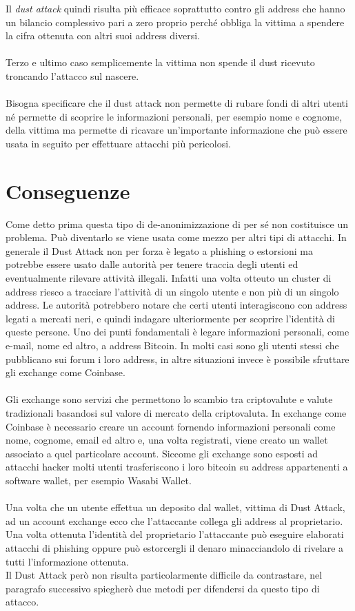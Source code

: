 \FloatBarrier
Il \textit{dust attack} quindi risulta più efficace soprattutto contro gli address che hanno un bilancio complessivo pari a zero proprio perché obbliga la vittima a spendere la cifra ottenuta con altri suoi address diversi.\\\\
Terzo e ultimo caso semplicemente la vittima non spende il dust ricevuto troncando l'attacco sul nascere.\\\\
Bisogna specificare che il dust attack non permette di rubare fondi di altri utenti né permette di scoprire le informazioni personali, per esempio nome e cognome, della vittima ma permette di ricavare un'importante informazione che può essere usata in seguito per effettuare attacchi più pericolosi.
\section{Conseguenze}
Come detto prima questa tipo di de-anonimizzazione di per sé non costituisce un problema. Può diventarlo se viene usata come mezzo per altri tipi di attacchi. In generale il Dust Attack non per forza è legato a phishing o estorsioni ma potrebbe essere usato dalle autorità per tenere traccia degli utenti ed eventualmente rilevare attività illegali. Infatti una volta otteuto un cluster di address riesco a tracciare l'attività di un singolo utente e non più di un singolo address. Le autorità potrebbero notare che certi utenti interagiscono con address legati a mercati neri, e quindi indagare ulteriormente per scoprire l'identità di queste persone. Uno dei punti fondamentali è legare informazioni personali, come e-mail, nome ed altro, a address Bitcoin. In molti casi sono gli utenti stessi che pubblicano sui forum i loro address, in altre situazioni invece è possibile sfruttare gli exchange come Coinbase.\\\\Gli exchange sono servizi che permettono lo scambio tra criptovalute e valute tradizionali basandosi sul valore di mercato della criptovaluta. In exchange come Coinbase è necessario creare un account fornendo informazioni personali come nome, cognome, email ed altro e, una volta registrati, viene creato un wallet associato a quel particolare account. Siccome gli exchange sono esposti ad attacchi hacker molti utenti trasferiscono i loro bitcoin su address appartenenti a software wallet, per esempio Wasabi Wallet.\\\\
Una volta che un utente effettua un deposito dal wallet, vittima di Dust Attack, ad un account exchange ecco che l'attaccante collega gli address al proprietario. Una volta ottenuta l'identità del proprietario l'attaccante può eseguire elaborati attacchi di phishing oppure può estorcergli il denaro minacciandolo di rivelare a tutti l'informazione ottenuta.\\ Il Dust Attack però non risulta particolarmente difficile da contrastare, nel paragrafo successivo spiegherò due metodi per difendersi da questo tipo di attacco.
